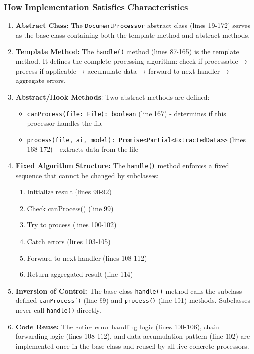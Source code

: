 \documentclass[11pt]{article}
\begin{document}
\subsubsection{How Implementation Satisfies Characteristics}

\begin{enumerate}[noitemsep]
    \item \textbf{Abstract Class:} The \texttt{DocumentProcessor} abstract class (lines 19-172) serves as the base class containing both the template method and abstract methods.

    \item \textbf{Template Method:} The \texttt{handle()} method (lines 87-165) is the template method. It defines the complete processing algorithm: check if processable → process if applicable → accumulate data → forward to next handler → aggregate errors.

    \item \textbf{Abstract/Hook Methods:} Two abstract methods are defined:
    \begin{itemize}[noitemsep]
        \item \texttt{canProcess(file: File): boolean} (line 167) - determines if this processor handles the file
        \item \texttt{process(file, ai, model): Promise<Partial<ExtractedData>>} (lines 168-172) - extracts data from the file
    \end{itemize}

    \item \textbf{Fixed Algorithm Structure:} The \texttt{handle()} method enforces a fixed sequence that cannot be changed by subclasses:
    \begin{enumerate}[noitemsep]
        \item Initialize result (lines 90-92)
        \item Check canProcess() (line 99)
        \item Try to process (lines 100-102)
        \item Catch errors (lines 103-105)
        \item Forward to next handler (lines 108-112)
        \item Return aggregated result (line 114)
    \end{enumerate}

    \item \textbf{Inversion of Control:} The base class \texttt{handle()} method calls the subclass-defined \texttt{canProcess()} (line 99) and \texttt{process()} (line 101) methods. Subclasses never call \texttt{handle()} directly.

    \item \textbf{Code Reuse:} The entire error handling logic (lines 100-106), chain forwarding logic (lines 108-112), and data accumulation pattern (line 102) are implemented once in the base class and reused by all five concrete processors.
\end{enumerate}
\end{document}
